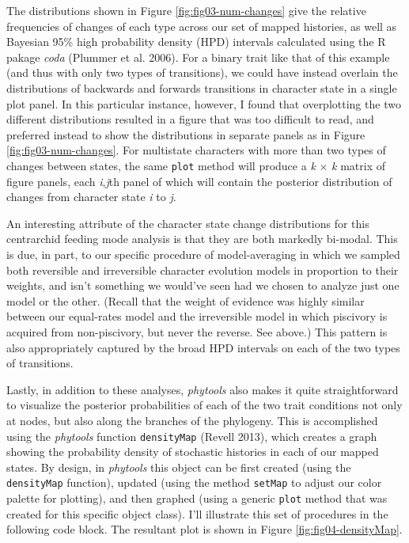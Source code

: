 \documentclass[fleqn,10pt,lineno]{wlpeerj} %
\begin{document}
The distributions shown in Figure \ref{fig:fig03-num-changes} give the relative frequencies of changes of each type across our set of mapped histories, as well as Bayesian 95\% high probability density (HPD) intervals calculated using the R pakage \emph{coda} (Plummer et al. 2006). For a binary trait like that of this example (and thus with only two types of transitions), we could have instead overlain the distributions of backwards and forwards transitions in character state in a single plot panel. In this particular instance, however, I found that overplotting the two different distributions resulted in a figure that was too difficult to read, and preferred instead to show the distributions in separate panels as in Figure \ref{fig:fig03-num-changes}. For multistate characters with more than two types of changes between states, the same \texttt{plot} method will produce a \emph{k} \(\times\) \emph{k} matrix of figure panels, each \emph{i},\emph{j}th panel of which will contain the posterior distribution of changes from character state \emph{i} to \emph{j}.

An interesting attribute of the character state change distributions for this centrarchid feeding mode analysis is that they are both markedly bi-modal. This is due, in part, to our specific procedure of model-averaging in which we sampled both reversible and irreversible character evolution models in proportion to their weights, and isn't something we would've seen had we chosen to analyze just one model or the other. (Recall that the weight of evidence was highly similar between our equal-rates model and the irreversible model in which piscivory is acquired from non-piscivory, but never the reverse. See above.) This pattern is also appropriately captured by the broad HPD intervals on each of the two types of transitions.

Lastly, in addition to these analyses, \emph{phytools} also makes it quite straightforward to visualize the posterior probabilities of each of the two trait conditions not only at nodes, but also along the branches of the phylogeny. This is accomplished using the \emph{phytools} function \texttt{densityMap} (Revell 2013), which creates a graph showing the probability density of stochastic histories in each of our mapped states. By design, in \emph{phytools} this object can be first created (using the \texttt{densityMap} function), updated (using the method \texttt{setMap} to adjust our color palette for plotting), and then graphed (using a generic \texttt{plot} method that was created for this specific object class). I'll illustrate this set of procedures in the following code block. The resultant plot is shown in Figure \ref{fig:fig04-densityMap}.
\end{document}
